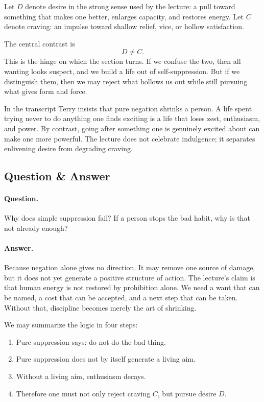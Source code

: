 \begin{definition}
Let \(D\) denote desire in the strong sense used by the lecture: a pull toward something that makes one better, enlarges capacity, and restores energy. Let \(C\) denote craving: an impulse toward shallow relief, vice, or hollow satisfaction.
\end{definition}

The central contrast is
\begin{equation}
D \neq C.
\end{equation}
This is the hinge on which the section turns. If we confuse the two, then all wanting looks suspect, and we build a life out of self-suppression. But if we distinguish them, then we may reject what hollows us out while still pursuing what gives form and force.

In the transcript Terry insists that pure negation shrinks a person. A life spent trying never to do anything one finds exciting is a life that loses zest, enthusiasm, and power. By contrast, going after something one is genuinely excited about can make one more powerful. The lecture does not celebrate indulgence; it separates enlivening desire from degrading craving.

\subsection{Question \& Answer}

\paragraph{Question.} Why does simple suppression fail? If a person stops the bad habit, why is that not already enough?

\paragraph{Answer.} Because negation alone gives no direction. It may remove one source of damage, but it does not yet generate a positive structure of action. The lecture's claim is that human energy is not restored by prohibition alone. We need a want that can be named, a cost that can be accepted, and a next step that can be taken. Without that, discipline becomes merely the art of shrinking.

We may summarize the logic in four steps:
\begin{enumerate}
\item Pure suppression says: do not do the bad thing.
\item Pure suppression does not by itself generate a living aim.
\item Without a living aim, enthusiasm decays.
\item Therefore one must not only reject craving \(C\), but pursue desire \(D\).
\end{enumerate}

